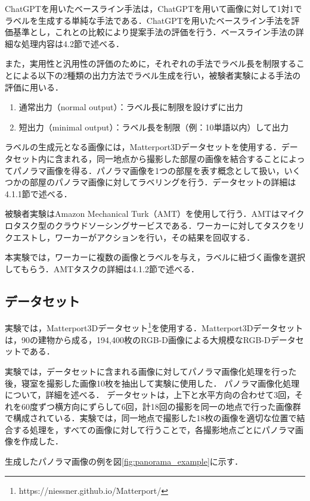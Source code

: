 \documentclass[a4paper,11pt]{jreport}
\begin{document}
ChatGPTを用いたベースライン手法は，ChatGPTを用いて画像に対して1対1でラベルを生成する単純な手法である．ChatGPTを用いたベースライン手法を評価基準とし，これとの比較により提案手法の評価を行う．ベースライン手法の詳細な処理内容は4.2節で述べる．

また，実用性と汎用性の評価のために，それぞれの手法でラベル長を制限することによる以下の2種類の出力方法でラベル生成を行い，被験者実験による手法の評価に用いる．

\begin{enumerate}
    \item 通常出力（normal output）：ラベル長に制限を設けずに出力
    \item 短出力（minimal output）：ラベル長を制限（例：10単語以内）して出力
\end{enumerate}

ラベルの生成元となる画像には，Matterport3Dデータセットを使用する．データセット内に含まれる，同一地点から撮影した部屋の画像を結合することによってパノラマ画像を得る．パノラマ画像を1つの部屋を表す概念として扱い，いくつかの部屋のパノラマ画像に対してラベリングを行う．データセットの詳細は4.1.1節で述べる．

被験者実験はAmazon Mechanical Turk（AMT）を使用して行う．AMTはマイクロタスク型のクラウドソーシングサービスである．ワーカーに対してタスクをリクエストし，ワーカーがアクションを行い，その結果を回収する．

本実験では，ワーカーに複数の画像とラベルを与え，ラベルに紐づく画像を選択してもらう．AMTタスクの詳細は4.1.2節で述べる．

\subsection{データセット}

実験では，Matterport3Dデータセット\footnote{https://niessner.github.io/Matterport/}を使用する．Matterport3Dデータセットは，90の建物から成る，194,400枚のRGB-D画像による大規模なRGB-Dデータセットである．

実験では，データセットに含まれる画像に対してパノラマ画像化処理を行った後，寝室を撮影した画像10枚を抽出して実験に使用した．
パノラマ画像化処理について，詳細を述べる．
データセットは，上下と水平方向の合わせて3回，それを60度ずつ横方向にずらして6回，計18回の撮影を同一の地点で行った画像群で構成されている．実験では，同一地点で撮影した18枚の画像を適切な位置で結合する処理を，すべての画像に対して行うことで，各撮影地点ごとにパノラマ画像を作成した．

生成したパノラマ画像の例を図\ref{fig:panorama_example}に示す．
\end{document}
